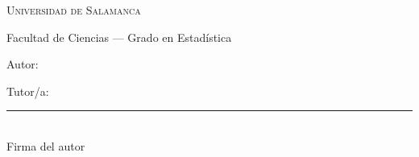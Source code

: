 \thispagestyle{empty}
\begin{center}
\vspace*{1cm}
{\Large\textsc{Universidad de Salamanca}\par}
\vspace{0.3cm}
{\large Facultad de Ciencias --- Grado en Estadística\par}
\vfill
{\huge\bfseries \TFGTitulo\par}
\vspace{0.4cm}
{\large \TFGSubtitulo\par}
\vfill
{\large Autor: \TFGAutor\par}
\vspace{0.5cm}
{\large Tutor/a: \TFGTutor\par}
\vfill
\vfill
\vspace{2cm}
\begin{minipage}{0.45\textwidth}
\centering
\rule{0.8\textwidth}{0.4pt}\\[0.2em]
{\small Firma del autor}
\end{minipage}
\vfill
{\large \TFGAnio\par}
\end{center}
\clearpage
